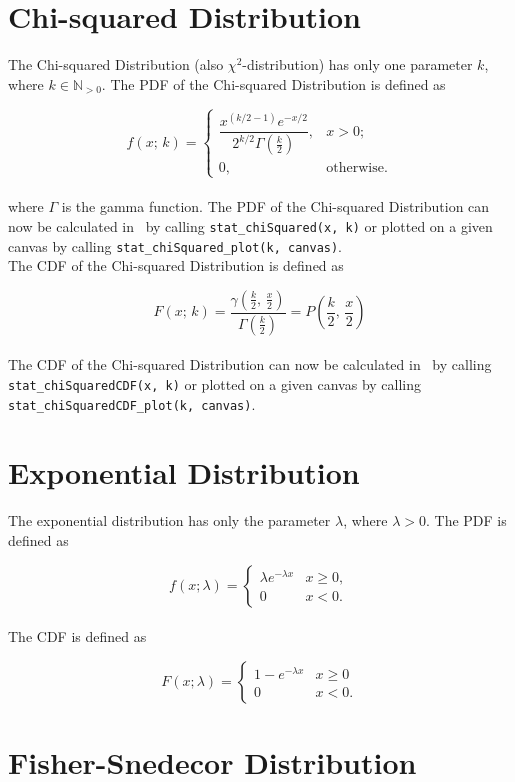 	\section{Chi-squared Distribution}

		The Chi-squared Distribution (also $\chi^2$-distribution) has only one parameter $k$, where $k \in \mathbb{N}_{>0}$. The \ac{PDF} of the Chi-squared Distribution is defined as

		$$f(x;\,k) =
		\begin{cases}
			\dfrac{x^{(k/2-1)} e^{-x/2}}{2^{k/2} \Gamma\left(\frac k 2 \right)},  & x > 0; \\ 0, & \text{otherwise}.
		\end{cases}$$
		\\[0.3cm]
		where $\Gamma$ is the gamma function. The \ac{PDF} of the Chi-squared Distribution can now be calculated in \setlx\ by calling \lstinline{stat_chiSquared(x, k)} or plotted on a given canvas by calling \lstinline{stat_chiSquared_plot(k, canvas)}.
		\\[0.3cm]
		The \ac{CDF} of the Chi-squared Distribution is defined as

		$$F(x;\,k) = \frac{\gamma(\frac{k}{2},\,\frac{x}{2})}{\Gamma(\frac{k}{2})} = P\left(\frac{k}{2},\,\frac{x}{2}\right)$$
		\\[0.3cm]
		The \ac{CDF} of the Chi-squared Distribution can now be calculated in \setlx\ by calling \lstinline{stat_chiSquaredCDF(x, k)} or plotted on a given canvas by calling \lstinline{stat_chiSquaredCDF_plot(k, canvas)}.

	\section{Exponential Distribution}

		The exponential distribution has only the parameter $\lambda$, where $\lambda > 0$. The \ac{PDF} is defined as

		$$f(x;\lambda) = \begin{cases} \lambda e^{-\lambda x} & x \ge 0, \\ 0 & x < 0. \end{cases}$$
		\\[0.3cm]
		The \ac{CDF} is defined as

		$$F(x;\lambda) = \begin{cases} 1-e^{-\lambda x} & x \ge 0 \\ 0 & x < 0. \end{cases}$$

	\section{Fisher-Snedecor Distribution} 

